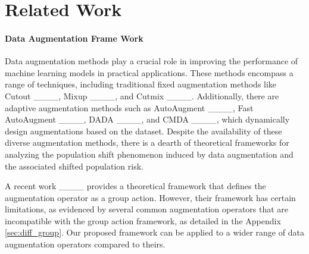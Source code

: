 \section{Related Work}
\paragraph{Data Augmentation Frame Work}
Data augmentation methods play a crucial role in improving the performance of machine learning models in practical applications. These methods encompass a range of techniques, including traditional fixed augmentation methods like Cutout ____, Mixup ____, and Cutmix  ____. Additionally, there are adaptive augmentation methods such as AutoAugment ____, Fast AutoAugment ____, DADA ____, and CMDA ____, which dynamically design augmentations based on the dataset. Despite the availability of these diverse augmentation methods, there is a dearth of theoretical frameworks for analyzing the population shift phenomenon induced by data augmentation and the associated shifted population risk.

A recent work ____ provides a theoretical framework that defines the augmentation operator as a group action. However, their framework has certain limitations, as evidenced by several common augmentation operators that are incompatible with the group action framework, as detailed in the Appendix \ref{sec:diff_group}. Our proposed framework can be applied to a wider range of data augmentation operators compared to theirs.

